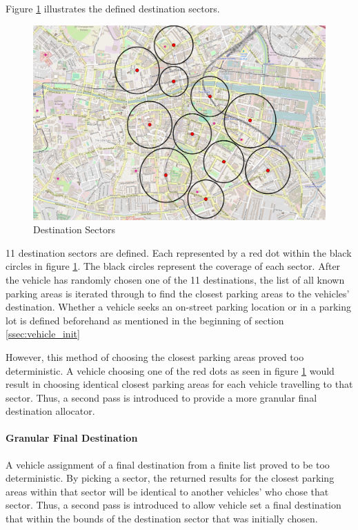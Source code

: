 Figure \ref{fig:destination_sectors_initial} illustrates the defined destination sectors.

\begin{figure}[H]
    \centering
    \includegraphics[width=\textwidth]{./Images/DESTINATIONSECTORSINITIAL.png}
    \caption{Destination Sectors}
    \label{fig:destination_sectors_initial}
\end{figure}

11 destination sectors are defined. Each represented by a red dot within the black circles in figure \ref{fig:destination_sectors_initial}. The black circles represent the coverage of each sector. After the vehicle has randomly chosen one of the 11 destinations, the list of all known parking areas is iterated through to find the closest parking areas to the vehicles' destination. Whether a vehicle seeks an on-street parking location or in a parking lot is defined beforehand as mentioned in the beginning of section \ref{ssec:vehicle_init}

However, this method of choosing the closest parking areas proved too deterministic. A vehicle choosing one of the red dots as seen in figure \ref{fig:destination_sectors_initial} would result in choosing identical closest parking areas for each vehicle travelling to that sector. Thus, a second pass is introduced to provide a more granular final destination allocator.

\paragraph{Granular Final Destination}
A vehicle assignment of a final destination from a finite list proved to be too deterministic. By picking a sector, the returned results for the closest parking areas within that sector will be identical to another vehicles' who chose that sector. Thus, a second pass is introduced to allow vehicle set a final destination that within the bounds of the destination sector that was initially chosen. 

